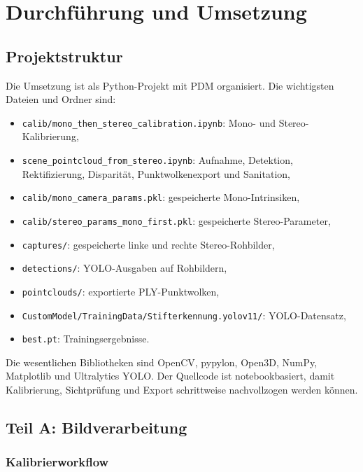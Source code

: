 \chapter{Durchführung und Umsetzung}

\section{Projektstruktur}

Die Umsetzung ist als Python-Projekt mit PDM organisiert. Die wichtigsten Dateien und Ordner
sind:

\begin{itemize}
    \item \texttt{calib/mono\_then\_stereo\_calibration.ipynb}: Mono- und Stereo-Kalibrierung,
    \item \texttt{scene\_pointcloud\_from\_stereo.ipynb}: Aufnahme, Detektion, Rektifizierung,
          Disparität, Punktwolkenexport und Sanitation,
    \item \texttt{calib/mono\_camera\_params.pkl}: gespeicherte Mono-Intrinsiken,
    \item \texttt{calib/stereo\_params\_mono\_first.pkl}: gespeicherte Stereo-Parameter,
    \item \texttt{captures/}: gespeicherte linke und rechte Stereo-Rohbilder,
    \item \texttt{detections/}: YOLO-Ausgaben auf Rohbildern,
    \item \texttt{pointclouds/}: exportierte PLY-Punktwolken,
    \item \texttt{CustomModel/TrainingData/Stifterkennung.yolov11/}: YOLO-Datensatz,
    \item \texttt{best.pt}: Trainingsergebnisse.
\end{itemize}

Die wesentlichen Bibliotheken sind OpenCV, pypylon, Open3D, NumPy, Matplotlib und Ultralytics
YOLO. Der Quellcode ist notebookbasiert, damit Kalibrierung, Sichtprüfung und Export
schrittweise nachvollzogen werden können.


\section{Teil A: Bildverarbeitung}

\subsection{Kalibrierworkflow}

